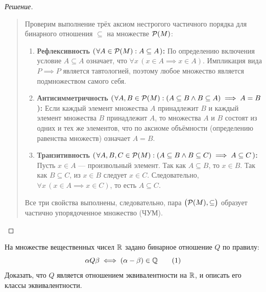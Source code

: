 \begin{proof}[Решение]~\\
    \begin{quote}
        Проверим выполнение трёх аксиом нестрогого частичного порядка для 
        бинарного отношения $\subseteq$ на множестве $\mathcal{P}(M)$:
        \begin{enumerate}
            \item \textbf{Рефлексивность ($\forall A \in \mathcal{P}(M) : 
            A \subseteq A$):} 
            По определению включения условие $A \subseteq A$ означает, что 
            $\forall x \, (x \in A \implies x \in A)$. Импликация вида 
            $P \implies P$ является тавтологией, поэтому любое множество 
            является подмножеством самого себя.
            \item \textbf{Антисимметричность ($\forall A, B \in \mathcal{P}(M) : 
            (A \subseteq B \land B \subseteq A) \implies A = B$):} 
            Если каждый элемент множества $A$ принадлежит $B$ и каждый 
            элемент множества $B$ принадлежит $A$, то множества $A$ и $B$ 
            состоят из одних и тех же элементов, что по аксиоме объёмности 
            (определению равенства множеств) означает $A = B$.
            \item \textbf{Транзитивность ($\forall A, B, C \in \mathcal{P}(M) : 
            (A \subseteq B \land B \subseteq C) \implies A \subseteq C$):} 
            Пусть $x \in A$ --- произвольный элемент. Так как $A \subseteq B$, 
            то $x \in B$. Так как $B \subseteq C$, из $x \in B$ следует 
            $x \in C$. Следовательно, $\forall x \, (x \in A \implies x \in C)$, 
            то есть $A \subseteq C$.
        \end{enumerate}
        Все три свойства выполнены, следовательно, пара 
        $\bigl(\mathcal{P}(M), \subseteq\bigr)$ образует частично 
        упорядоченное множество (ЧУМ).
    \end{quote}
\end{proof}

\begin{problem}
    На множестве вещественных чисел $\mathbb{R}$ задано бинарное отношение $Q$ по 
    правилу:
    \begin{equation} \label{eq:rel_q_def}
        \alpha Q \beta \iff (\alpha - \beta) \in \mathbb{Q} \tag{1}
    \end{equation}
    Доказать, что $Q$ является отношением эквивалентности на $\mathbb{R}$, и 
    описать его классы эквивалентности.
\end{problem}

